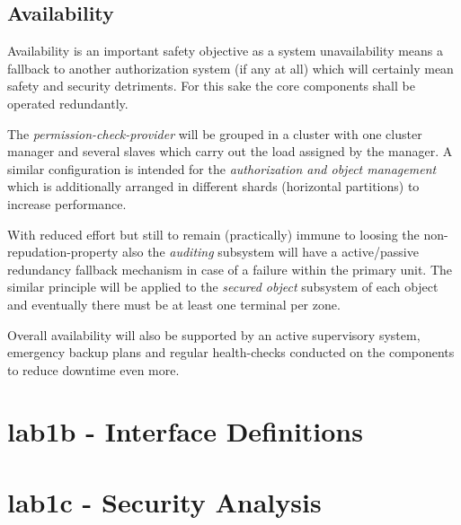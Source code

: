 \documentclass[12pt,a4paper,titlepage,oneside]{scrartcl}
\begin{document}
\subsection{Availability}
Availability is an important safety objective as a system unavailability means a fallback to another authorization system (if any at all)
which will certainly mean safety and security detriments. For this sake the core components shall be operated redundantly.

The \emph{permission-check-provider} will be grouped in a cluster with one cluster manager and several slaves which carry
out the load assigned by the manager. A similar configuration is intended for the \emph{authorization and object management} 
which is additionally arranged in different shards (horizontal partitions) to increase performance.

With reduced effort but still to remain (practically) immune to loosing the non-repudation-property also the \emph{auditing} subsystem
will have a active/passive redundancy fallback mechanism in case of a failure within the primary unit. The similar principle
will be applied to the \emph{secured object} subsystem of each object and eventually there must be at least one terminal per zone.

Overall availability will also be supported by an active supervisory system, emergency backup plans and regular health-checks
conducted on the components to reduce downtime even more.


\section{lab1b - Interface Definitions}

\section{lab1c - Security Analysis}


%
%
\end{document}
